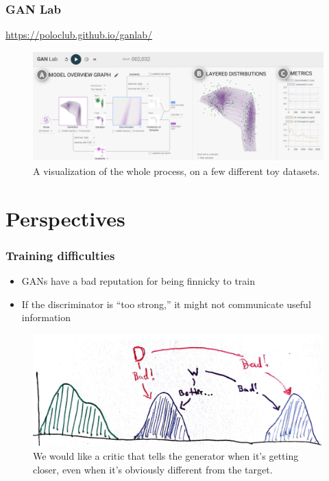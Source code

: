 \documentclass[10pt,mathserif]{beamer}
\begin{document}
\begin{frame}
  \frametitle{GAN Lab}
 \begin{itemize}
   \url{https://poloclub.github.io/ganlab/}
 \end{itemize}
\begin{figure}[ht]
  \centering
  \includegraphics[width=0.7\paperwidth]{figure/ganlab}
  \caption{A visualization of the whole process, on a few different toy
    datasets. \label{fig:ganlab} }
\end{figure}
\end{frame}

\section{Perspectives}
\label{sec:perspectives}

\begin{frame}
  \frametitle{Training difficulties}
 \begin{itemize}
 \item GANs have a bad reputation for being finnicky to train
 \item If the discriminator is ``too strong,'' it might not communicate useful
   information
 \end{itemize}
\begin{figure}[ht]
  \centering
  \includegraphics[width=0.7\paperwidth]{figure/alternative_critic}
  \caption{We would like a critic that tells the generator when it's getting
    closer, even when it's obviously different from the
    target. \label{fig:alternative_critic} }
\end{figure}
\end{frame}
\end{document}
